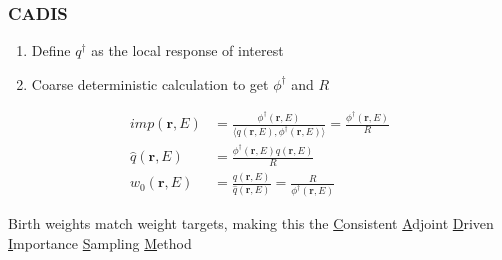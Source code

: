 \documentclass[xcolor=x11names,compress]{beamer}
\renewcommand{\(}{\begin{columns}}
\renewcommand{\)}{\end{columns}}
\newcommand{\<}[1]{\begin{column}{#1}}
\renewcommand{\>}{\end{column}}
\newcommand{\ve}[1]{\ensuremath{\mathbf{#1}}}
\begin{document}
\begin{frame}[fragile]
  \frametitle{CADIS}
  
  \begin{enumerate}
  \item Define $q^{\dagger}$ as the local response of interest\\
  \item Coarse deterministic calculation to get $\phi^{\dagger}$ and $R$
  \end{enumerate}
% 
\begin{align}
  imp(\ve{r}, E) &= \frac{\phi^{\dagger}(\ve{r}, E)}{\langle q(\ve{r}, E), \phi^{\dagger}(\ve{r}, E) \rangle} = \frac{\phi^{\dagger}(\ve{r}, E)}{R} \\
  \hat{q}(\ve{r}, E) &= \frac{\phi^{\dagger}(\ve{r}, E) q(\ve{r}, E)}{R} \\
  w_0(\ve{r}, E) &= \frac{q(\ve{r}, E)}{\hat{q}(\ve{r}, E)} = \frac{R}{\phi^{\dagger}(\ve{r}, E)} 
  \label{eq:Importance}
\end{align}

Birth weights match weight targets, making this the \underline{C}onsistent \underline{A}djoint \underline{D}riven \underline{I}mportance \underline{S}ampling \underline{M}ethod

\end{frame}
\end{document}
